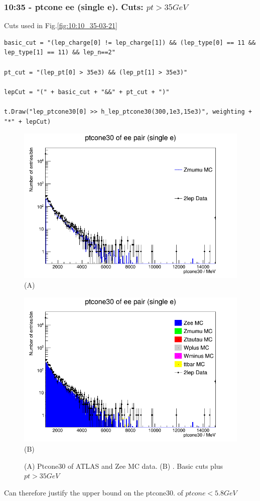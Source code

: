 \subsubsection*{10:35 - ptcone ee (single e). Cuts: $pt > 35 GeV$}
Cuts used in Fig.\ref{fig:10:10_35-03-21}
\begin{lstlisting}
basic_cut = "(lep_charge[0] != lep_charge[1]) && (lep_type[0] == 11 && lep_type[1] == 11) && lep_n==2"

pt_cut = "(lep_pt[0] > 35e3) && (lep_pt[1] > 35e3)"
    
lepCut = "(" + basic_cut + "&&" + pt_cut + ")"
    
t.Draw("lep_ptcone30[0] >> h_lep_ptcone30(300,1e3,15e3)", weighting + "*" + lepCut)
\end{lstlisting}
\begin{figure}[h!]
    \centering
    \begin{minipage}{0.5\textwidth}
        \centering
        \includegraphics[width=\linewidth]{plots/02-03-2021/10-37_2Stack.png}
        (A)
    \end{minipage}\hfill
    \begin{minipage}{0.5\textwidth}
        \centering
        \includegraphics[width=\linewidth]{plots/02-03-2021/10-35_AllStack.png}
        (B)
    \end{minipage}
    \caption{(A) Ptcone30 of ATLAS and Zee MC data. (B) . Basic cuts plus $pt > 35 GeV$}
    \label{}
\end{figure}
Can therefore justify the upper bound on the ptcone30. of $ptcone < 5.8 GeV$


